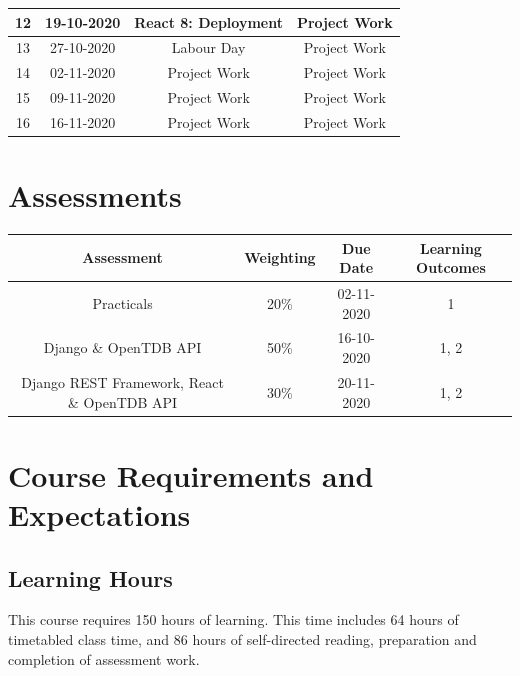 \documentclass{article}
\begin{document}
\begin{tabular}{|c|c|c|c|}
	\small 12     & \small 19-10-2020 & \small React 8:  Deployment                                & \small Project Work                         \\ \hline
	\small 13     & \small 27-10-2020 & \cellcolor{yellow} \small Labour Day                   & \small Project Work                                           \\ \hline
	\small 14     & \small 02-11-2020 & \small Project Work                                    & \small Project Work                                         \\ \hline
	\small 15     & \small 09-11-2020 & \small Project Work                                    & \small Project Work                                         \\ \hline
	\small 16     & \small 16-11-2020 & \small Project Work                                    & \small Project Work                                         \\ \hline
\end{tabular}

\section*{Assessments}
\renewcommand{\arraystretch}{1.5}
\begin{tabular}{|c|c|c|c|}
	\hline
	\textbf{Assessment}                                & \textbf{Weighting} & \textbf{Due Date} & \textbf{Learning Outcomes} \\ \hline 
	\small Practicals                                  & \small 20\%        & \small 02-11-2020 & \small 1                   \\ \hline
	\small Django \& OpenTDB API                       & \small 50\%        & \small 16-10-2020 & \small 1, 2                \\ \hline
	\small Django REST Framework, React \& OpenTDB API & \small 30\%        & \small 20-11-2020 & \small 1, 2                \\ \hline
\end{tabular}

\section*{Course Requirements and Expectations}

\subsection*{Learning Hours}
This course requires 150 hours of learning. This time includes 64 hours of timetabled class time, and 86 hours of self-directed reading, preparation and completion of assessment work.
\end{document}
